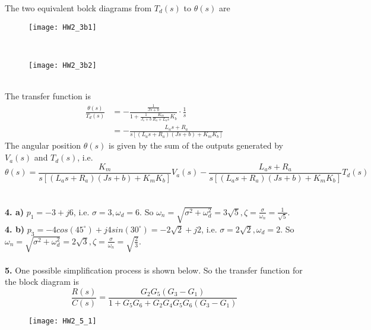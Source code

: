 \documentclass[11pt, a4paper]{article}
\begin{document}
The two equivalent bolck diagrams from $T_d(s)$ to $\theta(s)$ are\\
\begin{figure}[h]
\texttt{[image: HW2\_3b1]}
\centering
\end{figure}\\
\begin{figure}[h]
\texttt{[image: HW2\_3b2]}
\centering
\end{figure}\\
The transfer function is
\begin{equation*}
\begin{split}
\frac{\theta(s)}{T_d(s)} &= -\frac{\frac{1}{Js+b}}{1+\frac{1}{J_s+b}\frac{K_m}{R_a+L_as}K_b}\cdot\frac{1}{s}\\
                   			&= -\frac{L_as+R_a}{s[(L_as+R_a)(Js+b)+K_mK_b]}
\end{split}
\end{equation*}
The angular position $\theta(s)$ is given by the sum of the outputs generated by $V_a(s)$ and $T_d(s)$, i.e.
\begin{equation*}
\theta(s) = \frac{K_m}{s[(L_as+R_a)(Js+b)+K_mK_b]}V_a(s) - \frac{L_as+R_a}{s[(L_as+R_a)(Js+b)+K_mK_b]}T_d(s)
\end{equation*} 
\\
\\
\textbf{4. a)} $p_1 = -3+j6$, i.e. $\sigma = 3, \omega_d = 6.$ So $\omega_n = \sqrt{\sigma^2+\omega_d^2} = 3\sqrt{5},\zeta 
= \frac{\sigma}{\omega_n}=\frac{1}{\sqrt{5}}.$
\\
\textbf{4. b)} $p_3 = -4cos(45^{\circ})+j4sin(30^{\circ})=-2\sqrt{2}+j2$, i.e. $\sigma = 2\sqrt{2}, \omega_d = 2.$ So $\omega_n = \sqrt{\sigma^2+\omega_d^2} = 2\sqrt{3},\zeta = \frac{\sigma}{\omega_n}=\sqrt{\frac{2}{3}}.$
\\
\\
\textbf{5.} One possible simplification process is shown below. So the transfer function for the block diagram is 
\begin{equation*}
\frac{R(s)}{C(s)} = \frac{G_2G_5(G_3-G_1)}{1+G_5G_6+G_2G_4G_5G_6(G_3-G_1)}
\end{equation*}
\begin{figure}[h]
\centering
\texttt{[image: HW2\_5\_1]}
\end{figure}\\
\begin{figure}[h]
\centering
\subfigure{\texttt{[image: HW2\_5\_2]}}
\subfigure{\texttt{[image: HW2\_5\_3]}}
\subfigure{\texttt{[image: HW2\_5\_4]}}
\subfigure{\texttt{[image: HW2\_5\_5]}}
\subfigure{\texttt{[image: HW2\_5\_6]}}
\end{figure}
\end{document}
